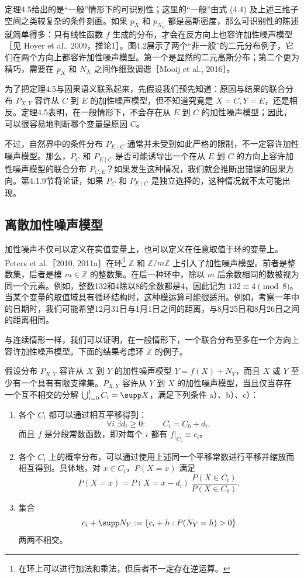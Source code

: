 定理4.5给出的是“一般”情形下的可识别性；这里的“一般”由式 (4.4) 及上述三维子空间之类较复杂的条件刻画。如果 $p_X$ 和 $p_{N_Y}$ 都是高斯密度，那么可识别性的陈述就简单得多：只有线性函数 $f$ 生成的分布，才会在反方向上也容许加性噪声模型［见 Hoyer et al., 2009，推论1］。图4.2展示了两个“非一般”的二元分布例子，它们在两个方向上都容许加性噪声模型。第一个是显然的二元高斯分布；第二个更为精巧，需要在 $p_X$ 和 $N_X$ 之间作细致调谐［Mooij et al., 2016］。



为了把定理4.5与因果语义联系起来，先假设我们预先知道：原因与结果的联合分布 $P_{X,Y}$ 容许从 $C$ 到 $E$ 的加性噪声模型，但不知道究竟是 $X=C,Y=E$，还是相反。定理4.5表明，在一般情形下，不会存在从 $E$ 到 $C$ 的加性噪声模型；因此，可以很容易地判断哪个变量是原因 $C$。

不过，自然界中的条件分布 $P_{E\mid C}$ 通常并未受到如此严格的限制，不一定容许加性噪声模型。那么，$P_C$ 和 $P_{E\mid C}$ 是否可能诱导出一个在从 $E$ 到 $C$ 的方向上容许加性噪声模型的联合分布 $P_{C,E}$？如果发生这种情况，我们就会推断出错误的因果方向。第4.1.9节将论证，如果 $P_C$ 和 $P_{E\mid C}$ 是独立选择的，这种情况就不太可能出现。

\subsection{离散加性噪声模型}

加性噪声不仅可以定义在实值变量上，也可以定义在任意取值于环的变量上。Peters et al.［2010, 2011a］在环\footnote{在环上可以进行加法和乘法，但后者不一定存在逆运算。}
$\mathbb{Z}$ 和 $\mathbb{Z}/m\mathbb{Z}$ 上引入了加性噪声模型。前者是整数集，后者是模 $m\in\mathbb{Z}$ 的整数集。在后一种环中，除以 $m$ 后余数相同的数被视为同一个元素。例如，整数132和4除以8的余数都是4，因此记为 $132\equiv4\pmod 8$。当某个变量的取值域具有循环结构时，这种模运算可能很适用。例如，考察一年中的日期时，我们可能希望12月31日与1月1日之间的距离，与8月25日和8月26日之间的距离相同。

与连续情形一样，我们可以证明，在一般情形下，一个联合分布至多在一个方向上容许加性噪声模型。下面的结果考虑环 $\mathbb{Z}$ 的例子。

\begin{theorem}[离散加性噪声模型的可识别性]
假设分布 $P_{X,Y}$ 容许从 $X$ 到 $Y$ 的加性噪声模型 $Y=f(X)+N_Y$，而且 $X$ 或 $Y$ 至少有一个具有有限支撑集。$P_{X,Y}$ 容许从 $Y$ 到 $X$ 的加性噪声模型，当且仅当存在一个互不相交的分解 $\bigcup_{i=0}^{l}C_i=\supp X$，满足下列条件 a）、b）、c）：
\begin{enumerate}[label=\alph*)]
 \item 各个 $C_i$ 都可以通过相互平移得到：
 \[
  \forall i\ \exists d_i\geq0:\qquad C_i=C_0+d_i,
 \]
 而且 $f$ 是分段常数函数，即对每个 $i$ 都有 $f|_{C_i}\equiv c_i$。
 \item 各个 $C_i$ 上的概率分布，可以通过使用上述同一个平移常数进行平移并缩放而相互得到。具体地，对 $x\in C_i$，$P(X=x)$ 满足
 \[
  P(X=x)=P(X=x-d_i)\,
  \frac{P(X\in C_i)}{P(X\in C_0)}.
 \]
 \item 集合
 \[
  c_i+\supp N_Y:=\{c_i+h:P(N_Y=h)>0\}
 \]
 两两不相交。
\end{enumerate}
\end{theorem}

